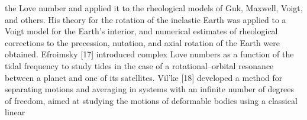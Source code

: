 \documentclass[12pt]{article}
\begin{document}
\begin{multicols}{2}
the Love number and applied it to the rheological
models of Guk, Maxwell, Voigt, and others. His
theory for the rotation of the inelastic Earth was applied
to a Voigt model for the Earth’s interior, and
numerical estimates of rheological corrections to the
precession, nutation, and axial rotation of the Earth
were obtained. Efroimsky [17] introduced complex
Love numbers as a function of the tidal frequency to
study tides in the case of a rotational–orbital resonance
between a planet and one of its satellites.
Vil’ke [18] developed a method for separating motions
and averaging in systems with an infinite number
of degrees of freedom, aimed at studying the
motions of deformable bodies using a classical linear
\end{multicols}

\pagebreak
\end{document}
